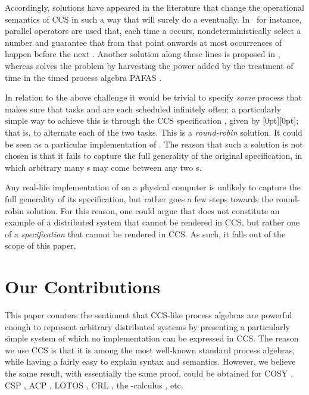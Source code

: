 \documentclass[smallcondensed]{svjour3}
\newcommand{\plat}[1]{\raisebox{0pt}[0pt][0pt]{#1}}  \def\precond#1{{\vphantom{#1}}^\bullet #1}
\newcounter {part}
\begin{document}
Accordingly, solutions have appeared in the literature that change the operational semantics of CCS
in such a way that  will surely do a  eventually. In~\cite{Plotkin82} for instance,
parallel operators  are used that, each time a  occurs, nondeterministically select a
number  and guarantee that from that point onwards at most  occurrences of  happen
before the next . Another solution along these lines is proposed in \cite{CS84}, whereas
\cite{CBV06} solves the problem by harvesting the power added by the treatment of time in the timed
process algebra PAFAS \cite{CVJ02}.

In relation to the above challenge it would be trivial to specify \emph{some} process that makes
sure that tasks  and  are each scheduled infinitely often; a particularly simple way to
achieve this is through the CCS specification ,\vspace{2pt} given by
\plat{}; that is, to alternate each of the two tasks.
This is a \emph{round-robin} solution.
It could be seen as a particular implementation of .
The reason that such a solution is not chosen is that it fails to capture the full generality of
the original specification, in which arbitrary many s may come between any two s.

Any real-life implementation of  on a physical computer is unlikely to capture the full
generality of its specification, but rather goes a few steps towards the round-robin solution.
For this reason, one could argue that  does not constitute an example of a distributed system
that cannot be rendered in CCS, but rather one of a \emph{specification} that
cannot be rendered in CCS\@. As such, it falls out of the scope of this paper.

\section{Our Contributions}\label{ssec:contribution}


This paper counters the sentiment that CCS-like process algebras are powerful
enough to represent arbitrary distributed systems by presenting a particularly simple system of which no
implementation can be expressed in CCS. 
The reason we use CCS is that it is among the most well-known standard process algebras, while having a fairly easy to explain
syntax and semantics. However, we believe the same result, with
essentially the same proof, could be obtained for COSY \cite{LTS79}, CSP \cite{BHR84,Ho85},
ACP \cite{BK86}, LOTOS \cite{BB87}, CRL \cite{GP95}, the -calculus \cite{MPW92}, etc.
\end{document}
